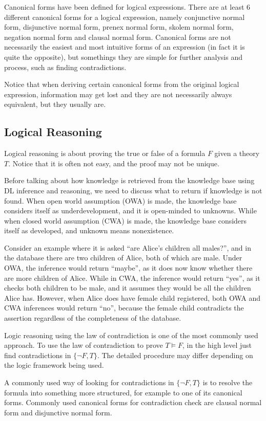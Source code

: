 Canonical forms have been defined for logical expressions. There are at least 6 different canonical forms for a logical expression, namely conjunctive normal form, disjunctive normal form, prenex normal form, skolem normal form, negation normal form and clausal normal form. Canonical forms are not necessarily the easiest and most intuitive forms of an expression (in fact it is quite the opposite), but somethings they are simple for further analysis and process, such as finding contradictions.

Notice that when deriving certain canonical forms from the original logical expression, information may get lost and they are not necessarily always equivalent, but they usually are.

\subsection{Logical Reasoning}

Logical reasoning is about proving the true or false of a formula $F$ given a theory $T$. Notice that it is often not easy, and the proof may not be unique.

Before talking about how knowledge is retrieved from the knowledge base using DL inference and reasoning, we need to discuss what to return if knowledge is not found. When open world assumption (OWA) is made, the knowledge base considers itself as underdevelopment, and it is open-minded to unknowns. While when closed world assumption (CWA) is made, the knowledge base considers itself as developed, and unknown means nonexistence.

Consider an example where it is asked ``are Alice's children all males?'', and in the database there are two children of Alice, both of which are male. Under OWA, the inference would return ``maybe'', as it does now know whether there are more children of Alice. While in CWA, the inference would return ``yes'', as it checks both children to be male, and it assumes they would be all the children Alice has. However, when Alice does have female child registered, both OWA and CWA inferences would return ``no'', because the female child contradicts the assertion regardless of the completeness of the database.

Logic reasoning using the law of contradiction is one of the most commonly used approach. To use the law of contradiction to prove $T\models F$, in the high level just find contradictions in $\{\neg F, T\}$. The detailed procedure may differ depending on the logic framework being used.

A commonly used way of looking for contradictions in $\{\neg F, T\}$ is to resolve the formula into something more structured, for example to one of its canonical forms. Commonly used canonical forms for contradiction check are clausal normal form and disjunctive normal form.
















